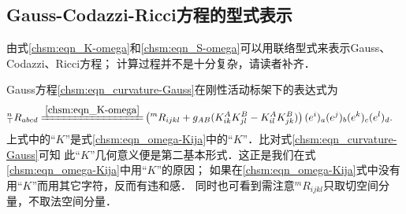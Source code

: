 

\subsection{Gauss-Codazzi-Ricci方程的型式表示}
由式\eqref{chsm:eqn_K-omega}和\eqref{chsm:eqn_S-omega}可以用联络型式来表示Gauss、Codazzi、Ricci方程；
计算过程并不是十分复杂，请读者补齐．

Gauss方程\eqref{chsm:eqn_curvature-Gauss}在刚性活动标架下的表达式为
\begin{equation}\label{chsm:eqn_curvature-Gauss-Frame}
    \begin{aligned}
        {}^{n}_{\top}{R}_{abcd} %
        \xlongequal{\ref{chsm:eqn_K-omega}}& \left({}^{m}{R}_{ijkl} +{g}_{AB} (K^A_{ik}K^B_{jl}
        - K^A_{il} K^B_{jk} ) \right)(e^i)_a (e^j)_b (e^k)_c (e^l)_d .
    \end{aligned}
\end{equation}  %
上式中的“$K$”是式\eqref{chsm:eqn_omega-Kija}中的“$K$”．比对式\eqref{chsm:eqn_curvature-Gauss}可知
此“$K$”几何意义便是第二基本形式．这正是我们在式\eqref{chsm:eqn_omega-Kija}中用“$K$”的原因；
如果在\eqref{chsm:eqn_omega-Kija}式中没有用“$K$”而用其它字符，反而有违和感．
同时也可看到需注意${}^{m}{R}_{ijkl}$只取切空间分量，不取法空间分量．

